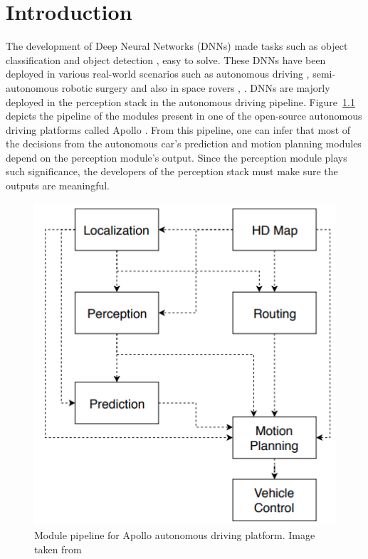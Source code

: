 

    \chapter{Introduction}

    The development of Deep Neural Networks (DNNs) made tasks such as object classification \cite{alexnet} and object detection \cite{fasterrcnn}, \cite{fastrcnn} easy to solve.
    These DNNs have been deployed in various real-world scenarios such as autonomous driving \cite{autonomousdriving}, semi-autonomous robotic surgery \cite{roboticsurgery} and also in space rovers \cite{Marsrover_1}, \cite{Marsrover_2}.
    DNNs are majorly deployed in the perception stack in the autonomous driving pipeline. 
    Figure~\ref{fig:Apollopipeline} depicts the pipeline of the modules present in one of the open-source autonomous driving platforms called Apollo \cite{baiduapollo}.
    From this pipeline, one can infer that most of the decisions from the autonomous car's prediction and motion planning modules depend on the perception module's output.
    Since the perception module plays such significance, the developers of the perception stack must make sure the outputs are meaningful.
\begin{figure}[h!]
    \centering
    \includegraphics[scale=0.35]{images/Apollopipeline.png}
    \caption{Module pipeline for Apollo autonomous driving platform. Image taken from \cite{baiduapollo}}
    \label{fig:Apollopipeline}
\end{figure}

